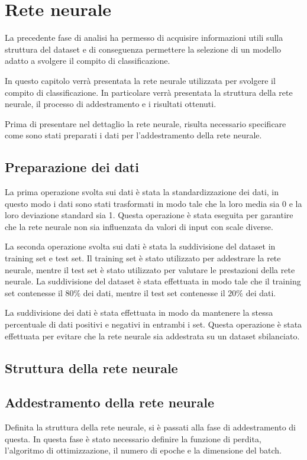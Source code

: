\chapter{Rete neurale} \label{chp:reteNeurale}
La precedente fase di analisi ha permesso di acquisire informazioni utili sulla
struttura del dataset e di conseguenza permettere la selezione di un modello
adatto a svolgere il compito di classificazione.

In questo capitolo verrà presentata la rete neurale utilizzata per svolgere il
compito di classificazione. In particolare verrà presentata la struttura della
rete neurale, il processo di addestramento e i risultati ottenuti.

Prima di presentare nel dettaglio la rete neurale, risulta necessario specificare 
come sono stati preparati i dati per l'addestramento della rete neurale.
\section{Preparazione dei dati}
La prima operazione svolta sui dati è stata la standardizzazione dei dati, in 
questo modo i dati sono stati trasformati in modo tale che la loro media sia 0
e la loro deviazione standard sia 1. Questa operazione è stata eseguita per
garantire che la rete neurale non sia influenzata da valori di input con scale
diverse.

La seconda operazione svolta sui dati è stata la suddivisione del dataset in
training set e test set. Il training set è stato utilizzato per addestrare la
rete neurale, mentre il test set è stato utilizzato per valutare le prestazioni
della rete neurale. La suddivisione del dataset è stata effettuata in modo tale
che il training set contenesse il $80\%$ dei dati, mentre il test set contenesse
il $20\%$ dei dati.

La suddivisione dei dati è stata effettuata in modo da mantenere la stessa 
percentuale di dati positivi e negativi in entrambi i set. Questa operazione è
stata effettuata per evitare che la rete neurale sia addestrata su un dataset
sbilanciato.
\section{Struttura della rete neurale}
\section{Addestramento della rete neurale}
Definita la struttura della rete neurale, si è passati alla fase di addestramento
di questa. In questa fase è stato necessario definire la funzione di perdita,
l'algoritmo di ottimizzazione, il numero di epoche e la dimensione del batch.

